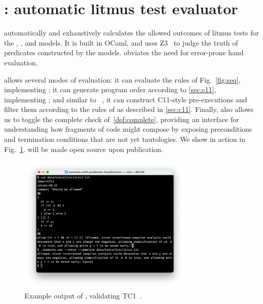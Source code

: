 \section{\PwTerTITLE: automatic litmus test evaluator}
\label{sec:tool}

\PwTer{} automatically and exhaustively calculates the allowed outcomes of litmus tests for the \PwT, \PwTpo, and \PwTc{} models. It is built in OCaml, and uses Z3~\cite{Z3Solver} to judge the truth of predicates constructed by the models. \PwTer{} obviates the need for error-prone hand evaluation.

\PwTer{} allows several modes of evaluation: it can evaluate the rules of Fig.~\ref{fig:seq}, implementing \PwT; it can generate program order according to \textsection\ref{sec:c11}, implementing \PwTpo; and similar to \MRD~\cite{DBLP:conf/esop/PaviottiCPWOB20}, it can construct C11-style pre-executions and filter them according to the rules of \rcXI{} as described in \textsection\ref{sec:c11}.
Finally, \PwTer{} also allows us to toggle the complete check of~\ref{def:complete}, providing an interface for understanding how fragments of code might compose by exposing preconditions and termination conditions that are not yet tautologies.
We show \PwTer{} in action in Fig.~\ref{fig:tool}. 
\PwTer{} will be made open source upon publication.

\begin{figure}[t]
\begin{center}
  \includegraphics[width=0.75\textwidth]{tool.png}
  \vspace{-2em}
  \caption{\label{fig:tool} Example output of \PwTer, validating TC1~\cite{PughWebsite}.}
\end{center}
\end{figure}
